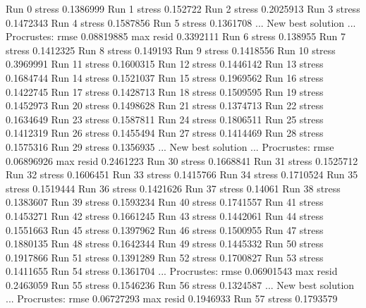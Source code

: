 \documentclass[
]{book}
\newenvironment{Shaded}{\begin{snugshade}}{\end{snugshade}}
\newcommand{\NormalTok}[1]{#1}
\begin{document}
\begin{Shaded}
\begin{Highlighting}[]
\NormalTok{Run 0 stress 0.1386999 }
\NormalTok{Run 1 stress 0.152722 }
\NormalTok{Run 2 stress 0.2025913 }
\NormalTok{Run 3 stress 0.1472343 }
\NormalTok{Run 4 stress 0.1587856 }
\NormalTok{Run 5 stress 0.1361708 }
\NormalTok{... New best solution}
\NormalTok{... Procrustes: rmse 0.08819885  max resid 0.3392111 }
\NormalTok{Run 6 stress 0.138955 }
\NormalTok{Run 7 stress 0.1412325 }
\NormalTok{Run 8 stress 0.149193 }
\NormalTok{Run 9 stress 0.1418556 }
\NormalTok{Run 10 stress 0.3969991 }
\NormalTok{Run 11 stress 0.1600315 }
\NormalTok{Run 12 stress 0.1446142 }
\NormalTok{Run 13 stress 0.1684744 }
\NormalTok{Run 14 stress 0.1521037 }
\NormalTok{Run 15 stress 0.1969562 }
\NormalTok{Run 16 stress 0.1422745 }
\NormalTok{Run 17 stress 0.1428713 }
\NormalTok{Run 18 stress 0.1509595 }
\NormalTok{Run 19 stress 0.1452973 }
\NormalTok{Run 20 stress 0.1498628 }
\NormalTok{Run 21 stress 0.1374713 }
\NormalTok{Run 22 stress 0.1634649 }
\NormalTok{Run 23 stress 0.1587811 }
\NormalTok{Run 24 stress 0.1806511 }
\NormalTok{Run 25 stress 0.1412319 }
\NormalTok{Run 26 stress 0.1455494 }
\NormalTok{Run 27 stress 0.1414469 }
\NormalTok{Run 28 stress 0.1575316 }
\NormalTok{Run 29 stress 0.1356935 }
\NormalTok{... New best solution}
\NormalTok{... Procrustes: rmse 0.06896926  max resid 0.2461223 }
\NormalTok{Run 30 stress 0.1668841 }
\NormalTok{Run 31 stress 0.1525712 }
\NormalTok{Run 32 stress 0.1606451 }
\NormalTok{Run 33 stress 0.1415766 }
\NormalTok{Run 34 stress 0.1710524 }
\NormalTok{Run 35 stress 0.1519444 }
\NormalTok{Run 36 stress 0.1421626 }
\NormalTok{Run 37 stress 0.14061 }
\NormalTok{Run 38 stress 0.1383607 }
\NormalTok{Run 39 stress 0.1593234 }
\NormalTok{Run 40 stress 0.1741557 }
\NormalTok{Run 41 stress 0.1453271 }
\NormalTok{Run 42 stress 0.1661245 }
\NormalTok{Run 43 stress 0.1442061 }
\NormalTok{Run 44 stress 0.1551663 }
\NormalTok{Run 45 stress 0.1397962 }
\NormalTok{Run 46 stress 0.1500955 }
\NormalTok{Run 47 stress 0.1880135 }
\NormalTok{Run 48 stress 0.1642344 }
\NormalTok{Run 49 stress 0.1445332 }
\NormalTok{Run 50 stress 0.1917866 }
\NormalTok{Run 51 stress 0.1391289 }
\NormalTok{Run 52 stress 0.1700827 }
\NormalTok{Run 53 stress 0.1411655 }
\NormalTok{Run 54 stress 0.1361704 }
\NormalTok{... Procrustes: rmse 0.06901543  max resid 0.2463059 }
\NormalTok{Run 55 stress 0.1546236 }
\NormalTok{Run 56 stress 0.1324587 }
\NormalTok{... New best solution}
\NormalTok{... Procrustes: rmse 0.06727293  max resid 0.1946933 }
\NormalTok{Run 57 stress 0.1793579 }

\end{Highlighting}
\end{Shaded}
\end{document}
